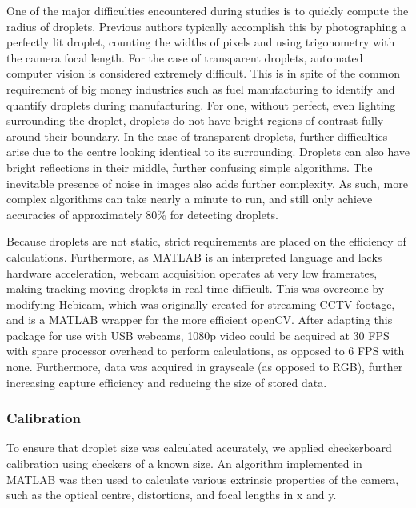 \documentclass{physics_article_B}
\begin{document}
            One of the major difficulties encountered during studies is to quickly compute the radius of droplets. Previous authors typically accomplish this by photographing a perfectly lit droplet, counting the widths of pixels and using trigonometry with the camera focal length. For the case of transparent droplets, automated computer vision is considered extremely difficult. This is in spite of the common requirement of big money industries such as fuel manufacturing to identify and quantify droplets during manufacturing\cite{bubblegeneral}. For one, without perfect, even lighting surrounding the droplet, droplets do not have bright regions of contrast fully around their boundary. In the case of transparent droplets, further difficulties arise due to the centre looking identical to its surrounding. Droplets can also have bright reflections in their middle, further confusing simple algorithms\cite{bubblegeneral}. The inevitable presence of noise in images also adds further complexity. As such, more complex algorithms can take nearly a minute to run, and still only achieve accuracies of approximately 80\%\cite{bubble2} for detecting droplets.

            Because droplets are not static, strict requirements are placed on the efficiency of calculations. Furthermore, as MATLAB is an interpreted language and lacks hardware acceleration, webcam acquisition operates at very low framerates, making tracking moving droplets in real time difficult. This was overcome by modifying Hebicam\cite{HebiCam}, which was originally created for streaming CCTV footage, and is a MATLAB wrapper for the more efficient openCV. After adapting this package for use with USB webcams, 1080p video could be acquired at 30 FPS with spare processor overhead to perform calculations, as opposed to 6 FPS with none. Furthermore, data was acquired in grayscale (as opposed to RGB), further increasing capture efficiency and reducing the size of stored data. 
            
    
        \subsubsection{Calibration\label{sect:method:vision:calib}}

            To ensure that droplet size was calculated accurately, we applied checkerboard calibration using checkers of a known size. An algorithm implemented in MATLAB\cite{CameraCalibration} was then used to calculate various extrinsic properties of the camera, such as the optical centre, distortions, and focal lengths in x and y. 
        
\end{document}
